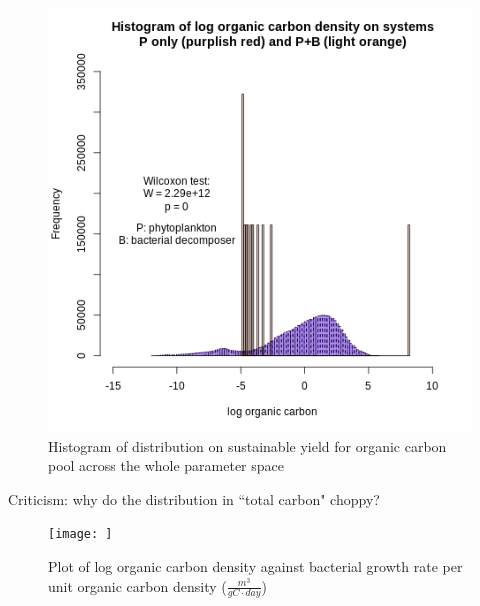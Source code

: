 \documentclass[../thesis.tex]{subfiles} %
\begin{document}
\begin{figure}[H]
    \centering
    \includegraphics[width=.7\linewidth]{report/media/hist_PvsPB_C.png}
    \caption{Histogram of distribution on sustainable yield for organic carbon pool across the whole parameter space}
    \label{hist:C}
\end{figure}

Criticism: why do the distribution in ``total carbon" choppy?

\begin{figure}
    \centering
    \texttt{[image: ]}
    \caption{Plot of log organic carbon density against bacterial growth rate per unit organic carbon density ($\frac{m^3}{gC\cdot day}$)}
    \label{fig:orgCVSgB}
\end{figure}
\end{document}
